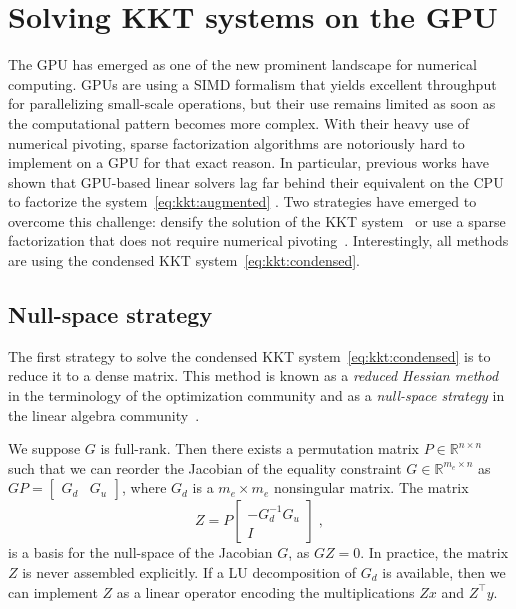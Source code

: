 \section{Solving KKT systems on the GPU}
The GPU has emerged as one of the new prominent landscape
for numerical computing. GPUs are using a SIMD formalism
that yields excellent throughput for parallelizing small-scale
operations, but their use remains limited as soon as the computational
pattern becomes more complex. With their heavy use of numerical
pivoting, sparse factorization algorithms are notoriously hard to implement
on a GPU for that exact reason. In particular, previous works have
shown that GPU-based linear solvers lag far behind their equivalent
on the CPU to factorize the system~\eqref{eq:kkt:augmented}
\cite{tasseff2019exploring,swirydowicz2021linear}. Two strategies
have emerged to overcome this challenge: densify the solution
of the KKT system~\cite{pacaud2022condensed} or use a sparse factorization that
does not require numerical pivoting~\cite{regev2023hykkt,shin2023accelerating}.
Interestingly, all methods are using the condensed KKT system~\eqref{eq:kkt:condensed}.

\subsection{Null-space strategy}
\label{sec:kkt:nullspace}
The first strategy to solve the condensed KKT system~\eqref{eq:kkt:condensed}
is to reduce it to a dense matrix. This
method is known as a \emph{reduced Hessian method} in the
terminology of the optimization community \cite{biegler1995reduced}
and as a \emph{null-space strategy} in the linear algebra
community~\cite[Section 6]{benzi2005numerical}.

We suppose $G$ is full-rank.
Then there exists a permutation matrix $P \in \mathbb{R}^{n \times n}$
such that we can reorder the Jacobian of the equality constraint
$G \in \mathbb{R}^{m_e \times n}$ as $GP = \begin{bmatrix}
  G_d & G_u
\end{bmatrix}$, where $G_d$ is a $m_e \times m_e$ nonsingular matrix.
The matrix
\begin{equation}
  \label{eq:nullspace}
  Z = P \begin{bmatrix}
    - G_d^{-1} G_u \\ I
  \end{bmatrix} \; ,
\end{equation}
is a basis for the null-space of the Jacobian $G$, as $GZ = 0$.
In practice, the matrix $Z$ is never assembled explicitly.
If a LU decomposition of $G_d$ is available, then we can
implement $Z$ as a linear operator encoding the multiplications
$Z x$ and $Z^\top y$.

